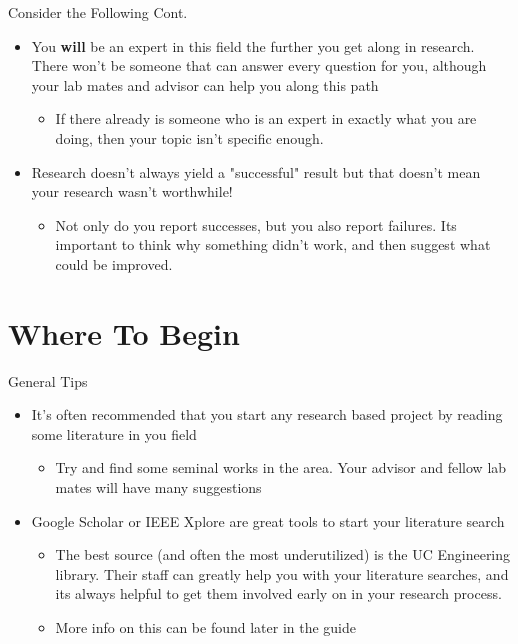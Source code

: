 \documentclass[handout]{beamer}
\begin{document}
\begin{frame}{Consider the Following Cont.}
  \begin{itemize}
    \item You \textbf{will} be an expert in this field the further you get along in research. There won't be someone that can answer every question for you, although your lab mates and advisor can help you along this path
    \begin{itemize}
        \item If there already is someone who is an expert in exactly what you are doing, then your topic isn't specific enough.
    \end{itemize}
    \item Research doesn't always yield a "successful" result but that doesn't mean your research wasn't worthwhile! 
    \begin{itemize}
      \item Not only do you report successes, but you also report failures. Its important to think why something didn't work, and then suggest what could be improved.
    \end{itemize}
  \end{itemize}
  \end{frame}

\section{Where To Begin}
\begin{frame}{General Tips}
\begin{itemize}
  \item It's often recommended that you start any research based project by reading some literature in you field
  \begin{itemize}
      \item Try and find some seminal works in the area. Your advisor and fellow lab mates will have many suggestions
  \end{itemize}
  \item Google Scholar or IEEE Xplore are great tools to start your literature search
  \begin{itemize}
      \item The best source (and often the most underutilized) is the UC Engineering library. Their staff can greatly help you with your literature searches, and its always helpful to get them involved early on in your research process.
      \item More info on this can be found later in the guide
  \end{itemize}
\end{itemize}
\end{frame}
\end{document}
